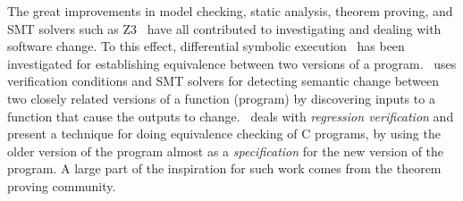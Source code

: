 The great improvements in model checking, static analysis, theorem
proving, and SMT solvers such as Z3~\cite{de2008z3} have all
contributed to investigating and dealing with software change. To this
effect, differential symbolic execution~\cite{person2008differential}
has been investigated for establishing equivalence between two
versions of a program.~\cite{lahiri2012symdiff} uses verification
conditions and SMT solvers for detecting semantic change between two
closely related versions of a function (program) by discovering inputs
to a function that cause the outputs to
change.~\cite{godlin2009regression} deals with \emph{regression
  verification} and present a technique for doing equivalence checking
of C programs, by using the older version of the program almost as a
\emph{specification} for the new version of the program. A large part
of the inspiration for such work comes from the theorem proving
community.



